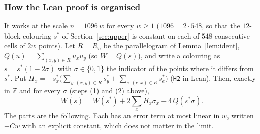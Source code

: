 \documentclass[11pt]{amsart}
\theoremstyle{remark}
\newcommand{\lean}[1]{\texttt{#1}}
\begin{document}
\subsubsection*{How the Lean proof is organised}
It works at the scale $n=1096\,w$ for every $w\ge1$ ($1096=2\cdot548$, so that the $12$-block colouring $s^*$ of Section~\ref{sec:upper} is constant on each of $548$ consecutive cells of $2w$ points). Let $R=R_n$ be the parallelogram of Lemma~\ref{lem:ident}, $Q(u)=\sum_{(x,y)\in R}u_xu_y$ (so $W=Q(s)$), and write a colouring as $s=s^*(1-2\sigma)$ with $\sigma\in\{0,1\}$ the indicator of the points where it differs from $s^*$. Put $H_x=-s^*_x\bigl(\sum_{y:(x,y)\in R}s^*_y+\sum_{e:(e,x)\in R}s^*_e\bigr)$ (\lean{H2} in Lean). Then, exactly in $\mathbb Z$ and for every $\sigma$ (steps (1) and (2) above),
\[W(s)=W(s^*)+2\sum_xH_x\sigma_x+4\,Q(s^*\sigma).\]
The parts are the following. Each has an error term at most linear in $w$, written $-Cw$ with an explicit constant, which does not matter in the limit.
\end{document}
